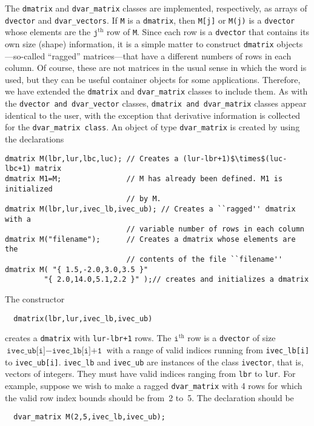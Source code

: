 \documentclass{admbmanual}
\begin{document}
The \texttt{dmatrix} and \texttt{dvar\_matrix} classes
 are implemented, respectively,
as arrays of \texttt{dvector} and \texttt{dvar\_vectors}. If \texttt{M} is a
\texttt{dmatrix}, then \texttt{M[j]} or \texttt{M(j)} is a \texttt{dvector}
whose elements are the $\texttt{j}^\textrm{th}$ row of \texttt{M}.
Since each row is a \texttt{dvector} that contains its own size (shape)
information, it is a simple matter to construct \texttt{dmatrix} objects---so-called ``ragged'' matrices---that have a different numbers of rows in each column. Of course, these are not matrices in the
usual sense in which the word is used, 
but they can be useful container objects for
some applications.  Therefore, we have extended the  \texttt{dmatrix} and
\texttt{dvar\_matrix} classes
to include them.
As with the \texttt{dvector and dvar\_vector} classes,
\texttt{dmatrix and dvar\_matrix} classes appear identical to
the user, with the exception that derivative information
is collected for the \texttt{dvar\_matrix class}.
An object of type \texttt{dvar\_matrix} is created by using the declarations
\begin{lstlisting}
dmatrix M(lbr,lur,lbc,luc); // Creates a (lur-lbr+1)$\times$(luc-lbc+1) matrix
dmatrix M1=M;               // M has already been defined. M1 is initialized 
                            // by M.
dmatrix M(lbr,lur,ivec_lb,ivec_ub); // Creates a ``ragged'' dmatrix with a 
                            // variable number of rows in each column
dmatrix M("filename");      // Creates a dmatrix whose elements are the 
                            // contents of the file ``filename''
dmatrix M( "{ 1.5,-2.0,3.0,3.5 }"
         "{ 2.0,14.0,5.1,2.2 }" );// creates and initializes a dmatrix
\end{lstlisting}

The constructor 
\begin{lstlisting}
  dmatrix(lbr,lur,ivec_lb,ivec_ub)
\end{lstlisting}
creates a \texttt{dmatrix} with \texttt{lur-lbr+1} rows. The $\texttt{i}^\textrm{th}$ row
is a \texttt{dvector} of size $\texttt{ivec\_ub[i]} - \texttt{ivec\_lb[i]+1}$ with
a range of valid indices running from \texttt{ivec\_lb[i]} to
\texttt{ivec\_ub[i]}. \texttt{ivec\_lb} and \texttt{ivec\_ub} are
instances of the class \texttt{ivector}, that is, vectors of
integers. They must have valid indices ranging from
\texttt{lbr} to \texttt{lur}. For example, suppose we wish to make
a ragged \texttt{dvar\_matrix} with 4 rows for which the valid row index bounds 
should be from~2 to~5. The declaration should be
\begin{lstlisting} 
  dvar_matrix M(2,5,ivec_lb,ivec_ub);
\end{lstlisting}
\end{document}
